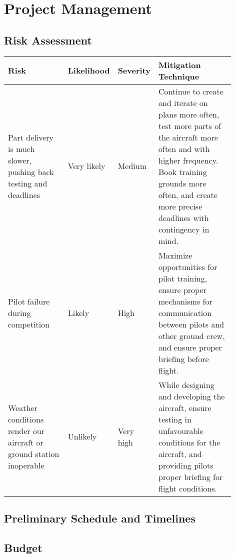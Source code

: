 \clearpage
\section{Project Management}
\label{sec:technical}

\subsection{Risk Assessment}

\begin{table}[htpb]
	\centering
	\begin{tabular}{p{0.28\linewidth}  p{0.14\linewidth}  p{0.12\linewidth}
		 p{0.36\linewidth} }

		\textbf{Risk} &
		\textbf{Likelihood} & \textbf{Severity} &
		\textbf{Mitigation Technique} \\ \midrule

	    Part delivery is much
		slower, pushing back
		testing and deadlines &
		Very likely & Medium & %
		Continue to create and iterate on plans more often, test more parts of
		the aircraft more often and with higher frequency. Book training
		grounds more often, and create more precise deadlines with contingency
		in mind. \\ \midrule

	    Pilot failure during competition &
		Likely & High & %
		Maximize opportunities for pilot training, ensure proper mechanisms for
		communication between pilots and other ground crew, and ensure proper
		briefing before flight. \\ \midrule

	    Weather conditions render our aircraft or ground station inoperable &
		Unlikely & Very high & %
		While designing and developing the aircraft, ensure testing in
		unfavourable conditions for the aircraft, and providing pilots proper
		briefing for flight conditions. \\ \midrule

	\end{tabular}
\end{table}

\subsection{Preliminary Schedule and Timelines}


\subsection{Budget}

